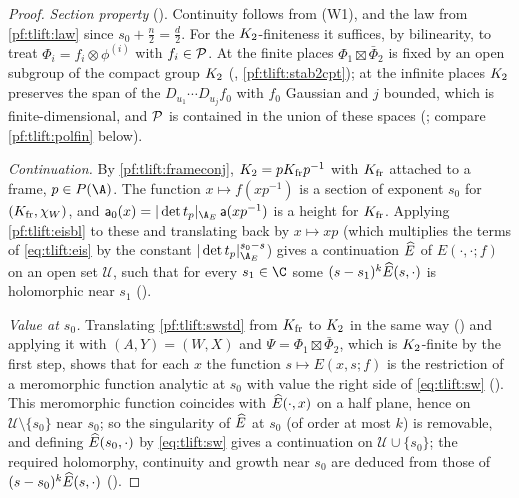 \begin{proof}
\emph{Section property} (). Continuity follows from (W1), and
the law from \cref{pf:tlift:law} since $s_0+\frac n2=\frac d2$. For the $K_2$-finiteness it suffices, by
bilinearity, to treat $\Phi_i=f_i\otimes\phi^{(i)}$ with $f_i\in\mathcal{P}$. At the finite places
$\Phi_1\boxtimes\bar\Phi_2$ is fixed by an open subgroup of the compact group $K_2$
(, \cref{pf:tlift:stab2cpt}); at the infinite places $K_2$
preserves the span of the $D_{u_1}\cdots D_{u_j}f_0$ with $f_0$ Gaussian and $j$ bounded, which is
finite-dimensional, and $\mathcal{P}$ is contained in the union of these spaces
(; compare \cref{pf:tlift:polfin} below).

\emph{Continuation.} By \cref{pf:tlift:frameconj}, $K_2=pK_{\mathrm{fr}} p^{-1}$ with $K_{\mathrm{fr}}$ attached to a frame,
$p\in P(\A)$. The function $x\mapsto f(xp^{-1})$ is a section of exponent $s_0$ for $(K_{\mathrm{fr}},\chi_W)$, and
$\tliftht_0(x)=|\det t_p|_{\tliftAE}\,\tliftht(xp^{-1})$ is a height for $K_{\mathrm{fr}}$. Applying
\cref{pf:tlift:eisbl} to these and translating back by $x\mapsto xp$ (which multiplies the terms of
\eqref{eq:tlift:eis} by the constant $|\det t_p|_{\tliftAE}^{s_0-s}$) gives a continuation $\widehat{E}$ of
$E(\cdot,\cdot;f)$ on an open set $\mathcal U$, such that for every $s_1\in\C$ some $(s-s_1)^k\widehat{E}(s,\cdot)$ is
holomorphic near $s_1$ ().

\emph{Value at $s_0$.} Translating \cref{pf:tlift:swstd} from $K_{\mathrm{fr}}$ to $K_2$ in the same way
() and applying it with $(A,Y)=(W,X)$ and
$\Psi=\Phi_1\boxtimes\bar\Phi_2$, which is $K_2$-finite by the first step, shows that for each $x$ the function
$s\mapsto E(x,s;f)$ is the restriction of a meromorphic function analytic at $s_0$ with value the right
side of \eqref{eq:tlift:sw} (). This meromorphic
function coincides with $\widehat{E}(\cdot,x)$ on a half plane, hence on $\mathcal U\setminus\{s_0\}$ near $s_0$; so the
singularity of $\widehat{E}$ at $s_0$ (of order at most $k$) is removable, and defining $\widehat{E}(s_0,\cdot)$ by
\eqref{eq:tlift:sw} gives a continuation on $\mathcal U\cup\{s_0\}$; the required holomorphy, continuity and
growth near $s_0$ are deduced from those of $(s-s_0)^k\widehat{E}(s,\cdot)$
().
\end{proof}

